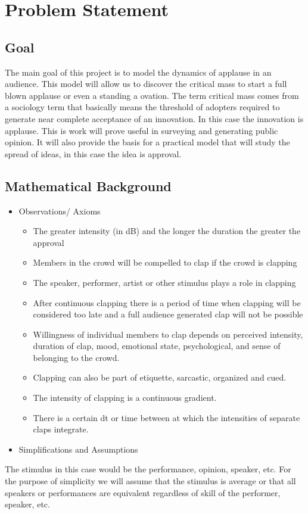 \documentclass[12pt,letterpaper]{article}
\theoremstyle{definition}
\begin{document}
\section{Problem Statement}
\subsection{Goal} %
The main goal of this project is to model the dynamics of applause in an audience. This model will allow us to discover the critical mass to start a full blown applause or even a standing a ovation. The term critical mass comes from a sociology term that basically means the threshold of adopters required to generate near complete acceptance of an innovation. In this case the innovation is applause. This is work will prove useful in surveying and generating public opinion. It will also provide the basis for a practical model that will study the spread of ideas, in this case the idea is approval. 
\subsection{Mathematical Background}%
\begin{itemize}
\item  Observations/ Axioms
    \begin{itemize}
	\item The greater intensity (in dB) and the longer the duration the greater the approval
	\item Members in the crowd will be compelled to clap if the crowd is clapping
	\item The speaker, performer, artist or other stimulus plays a role in clapping
	\item After continuous clapping there is a period of time when clapping will be considered too late and a full audience generated clap will not be possible
	\item Willingness of individual members to clap depends on perceived intensity, duration of clap, mood, emotional state, psychological, and sense of belonging to the crowd.
	\item Clapping can also be part of etiquette, sarcastic, organized and cued. 
	\item The intensity of clapping is a continuous gradient.
	\item There is a certain dt or time between at which the intensities of separate claps integrate.
		\end{itemize}
\item Simplifications and Assumptions
\end{itemize}
The stimulus in this case would be the performance, opinion, speaker, etc. For the purpose of simplicity we will assume that the stimulus is average or that all speakers or performances are equivalent regardless of skill of the performer, speaker, etc.
\end{document}
